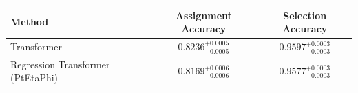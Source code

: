     \begin{tabular}{lcc}
        \toprule
        Method & Assignment Accuracy & Selection Accuracy \\
        \midrule
        Transformer & $0.8236_{-0.0005}^{+0.0005}$ & $0.9597_{-0.0003}^{+0.0003}$ \\
        Regression Transformer (PtEtaPhi) & $0.8169_{-0.0006}^{+0.0006}$ & $0.9577_{-0.0003}^{+0.0003}$ \\
        \bottomrule
    \end{tabular}